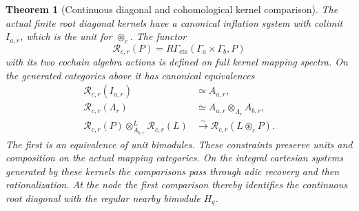 \documentclass[11pt]{article}
\newtheorem{theorem}[proposition]{Theorem}
\theoremstyle{definition}
\theoremstyle{remark}
\begin{document}
\begin{theorem}[Continuous diagonal and cohomological kernel comparison]
\label{thm:continuous-root-diagonal}
The actual finite root diagonal kernels have a canonical inflation
system with colimit $I_{a,r}$, which is the unit for
$\circledast_c$.  The functor
\[
 \mathcal R_{c,r}(P)=
 R\Gamma_{\mathrm{cts}}(\Gamma_a\times\Gamma_b,P)
\]
with its two cochain algebra actions is defined on full kernel
mapping spectra.  On the generated categories above it has
canonical equivalences
\begin{align*}
 \mathcal R_{c,r}(I_{a,r})&\simeq A_{a,r},\\
 \mathcal R_{c,r}(\Lambda_r)&\simeq A_{a,r}\otimes_{\Lambda_r}A_{b,r},\\
 \mathcal R_{c,r}(P)\otimes_{A_{b,r}}^L\mathcal R_{c,r}(L)
      &\xrightarrow{\sim}\mathcal R_{c,r}(L\circledast_c P).
\end{align*}
The first is an equivalence of unit \emph{bimodules}.  These
constraints preserve units and composition on the actual mapping
categories.  On the integral cartesian systems generated by these
kernels the comparisons pass through adic recovery and then
rationalization.  At the node the first comparison thereby identifies
the continuous root diagonal with the regular nearby bimodule $H_q$.
\end{theorem}
\end{document}
